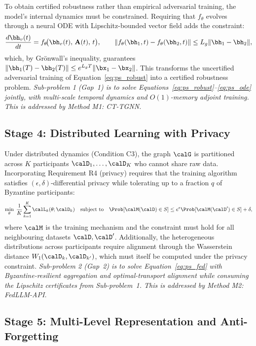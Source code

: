 To obtain certified robustness rather than empirical adversarial training, the model's internal dynamics must be constrained. Requiring that $f_\theta$ evolves through a neural ODE with Lipschitz-bounded vector field adds the constraint:
\begin{equation}
\frac{d\bh_v(t)}{dt} = f_\theta\!\bigl(\bh_v(t),\,\mathbf{A}(t),\,t\bigr),
\qquad
\|f_\theta(\bh_1,t)-f_\theta(\bh_2,t)\| \le L_g\|\bh_1-\bh_2\|,
\label{eq:ps_ode}
\end{equation}
which, by Gr\"{o}nwall's inequality, guarantees $\|\bh_1(T)-\bh_2(T)\|\le e^{L_gT}\|\bx_1-\bx_2\|$. This transforms the uncertified adversarial training of Equation~\eqref{eq:ps_robust} into a certified robustness problem. \emph{Sub-problem 1 (Gap~1) is to solve Equations~\eqref{eq:ps_robust}--\eqref{eq:ps_ode} jointly, with multi-scale temporal dynamics and $O(1)$-memory adjoint training. This is addressed by Method M1: CT-TGNN.}


\subsection{Stage 4: Distributed Learning with Privacy}

Under distributed dynamics (Condition C3), the graph $\calG$ is partitioned across $K$ participants $\calD_1,\ldots,\calD_K$ who cannot share raw data. Incorporating Requirement R4 (privacy) requires that the training algorithm satisfies $(\epsilon,\delta)$-differential privacy while tolerating up to a fraction $q$ of Byzantine participants:
\begin{equation}
\min_\theta\;
\frac{1}{K}\sum_{k=1}^{K}\calL_k(\theta;\calD_k)
\quad\text{subject to}\quad
\Prob[\calM(\calD)\in S] \le e^{\epsilon}\Prob[\calM(\calD')\in S]+\delta,
\label{eq:ps_fed}
\end{equation}
where $\calM$ is the training mechanism and the constraint must hold for all neighbouring datasets $\calD,\calD'$. Additionally, the heterogeneous distributions across participants require alignment through the Wasserstein distance $W_1(\calD_k,\calD_{k'})$, which must itself be computed under the privacy constraint. \emph{Sub-problem 2 (Gap~2) is to solve Equation~\eqref{eq:ps_fed} with Byzantine-resilient aggregation and optimal-transport alignment while consuming the Lipschitz certificates from Sub-problem~1. This is addressed by Method M2: FedLLM-API.}


\subsection{Stage 5: Multi-Level Representation and Anti-Forgetting}

